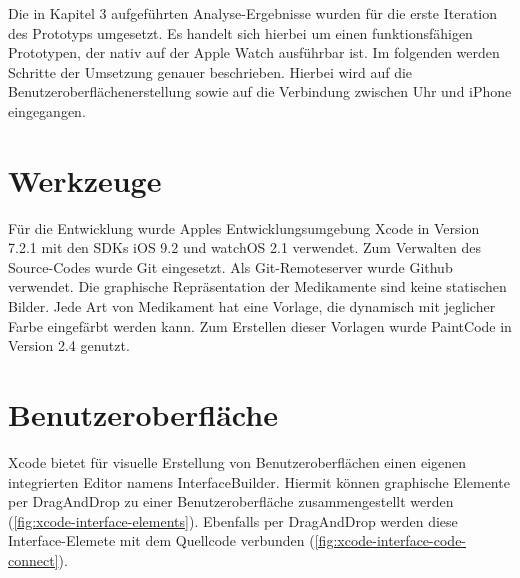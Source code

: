 
Die in Kapitel 3 aufgeführten Analyse-Ergebnisse wurden für die erste Iteration des Prototyps umgesetzt. Es handelt sich hierbei um einen funktionsfähigen Prototypen, der nativ auf der Apple Watch ausführbar ist. Im folgenden werden Schritte der Umsetzung genauer beschrieben. Hierbei wird auf die Benutzeroberflächenerstellung sowie auf die Verbindung zwischen Uhr und iPhone eingegangen.

\section{Werkzeuge}
Für die Entwicklung wurde Apples Entwicklungsumgebung Xcode in Version 7.2.1 mit den SDKs iOS 9.2 und watchOS 2.1 verwendet. Zum Verwalten des Source-Codes wurde Git\cite{git} eingesetzt. Als Git-Remoteserver wurde Github \cite{github} verwendet. Die graphische Repräsentation der Medikamente sind keine statischen Bilder. Jede Art von Medikament hat eine Vorlage, die dynamisch mit jeglicher Farbe eingefärbt werden kann. Zum Erstellen dieser Vorlagen wurde PaintCode in Version 2.4 \cite{paintCode} genutzt.

\section{Benutzeroberfläche}
\label{ch:userinterface}
Xcode bietet für visuelle Erstellung von Benutzeroberflächen einen eigenen integrierten Editor namens InterfaceBuilder. Hiermit können graphische Elemente per DragAndDrop zu einer Benutzeroberfläche zusammengestellt werden (\ref{fig:xcode-interface-elements}). Ebenfalls per DragAndDrop werden diese Interface-Elemete mit dem Quellcode verbunden (\ref{fig:xcode-interface-code-connect}).

